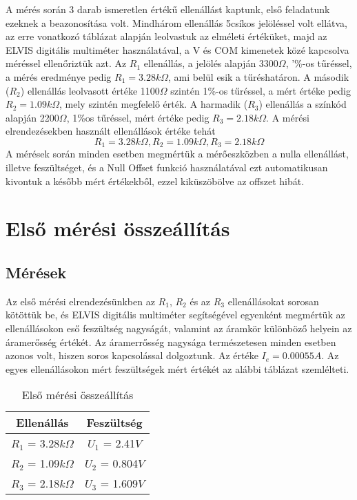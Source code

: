\documentclass[10pt, conference,a4paper]{ITKproc}
\begin{document}
A mérés során 3 darab ismeretlen értékű ellenállást kaptunk, első feladatunk ezeknek a beazonosítása volt. Mindhárom ellenállás 5csíkos jelöléssel volt ellátva, az erre vonatkozó táblázat alapján leolvastuk az elméleti értéküket, majd az ELVIS digitális multiméter használatával, a V és COM kimenetek közé kapcsolva méréssel ellenőriztük azt. Az $R_1$ ellenállás, a jelölés alapján 3300$\Omega$, '\%-os tűréssel, a mérés eredménye pedig $R_1 = 3.28 k\Omega$, ami belül esik a tűréshatáron. A második ($R_2$) ellenállás leolvasott értéke 1100$\Omega$ szintén 1\%-os tűréssel, a mért értéke pedig $R_2 = 1.09k\Omega$, mely szintén megfelelő érték. A harmadik ($R_3$) ellenállás a színkód alapján 2200$\Omega$, 1\%os tűréssel, mért értéke pedig $R_3 = 2.18k\Omega$. A mérési elrendezésekben használt ellenállások értéke tehát \[R_1 = 3.28k\Omega, R_2 = 1.09k\Omega, R_3 = 2.18k\Omega \]
A mérések során minden esetben megmértük a mérőeszközben a nulla ellenállást, illetve feszültséget, és a Null Offset funkció használatával ezt automatikusan kivontuk a később mért értékekből, ezzel kiküszöbölve az offszet hibát. 

\section{Első mérési összeállítás}
\subsection{Mérések}

Az első mérési elrendezésünkben az $R_1$, $R_2$ és az $R_3$ ellenállásokat sorosan kötöttük be, és ELVIS digitális multiméter segítségével egyenként megmértük az ellenállásokon eső feszültség nagyságát, valamint az áramkör különböző helyein az áramerősség értékét. Az áramerrősség nagysága természetesen minden esetben azonos volt, hiszen soros kapcsolással dolgoztunk. Az értéke $I_e = 0.00055 A$. Az egyes ellenállásokon mért feszültségek mért értékét az alábbi táblázat szemlélteti. 

\begin{table}[ht!]
\renewcommand{\arraystretch}{1.3}
\caption{Első mérési összeállítás}
\centering
\begin{tabular}{c||c}
\hline
\bfseries Ellenállás & \bfseries Feszültség \\
\hline\hline
 $R_1$ = 3.28$k\Omega$ & $U_1$ = 2.41$V$\\
\hline
 $R_2$ = 1.09$k\Omega$ & $U_2$ = 0.804$V$ \\
\hline
$R_3$ = 2.18$k\Omega$ & $U_3$ = 1.609$V$ \\
\hline
\end{tabular}
\end{table}
\end{document}
